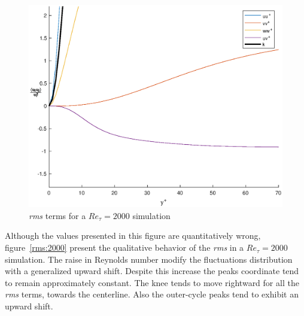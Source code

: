 \begin{figure}
\begin{center}
\includegraphics[scale=0.55]{grafici/budget+k_2000.eps}
\caption{\emph{rms} terms for a $Re_{\tau}=2000$ simulation}
\label{budget:2000}
\end{center} 
\end{figure}


Although the values presented in this figure are quantitatively wrong, figure~\ref{rms:2000} present the qualitative behavior of the \emph{rms} in a $Re_{\tau}=2000$ simulation. The raise in Reynolds number modify the fluctuations distribution with a generalized upward shift. Despite this increase the peaks coordinate tend to remain approximately constant. The knee tends to move rightward for all the \emph{rms} terms, towards the centerline. Also the outer-cycle peaks tend to exhibit an upward shift.\\~\par

